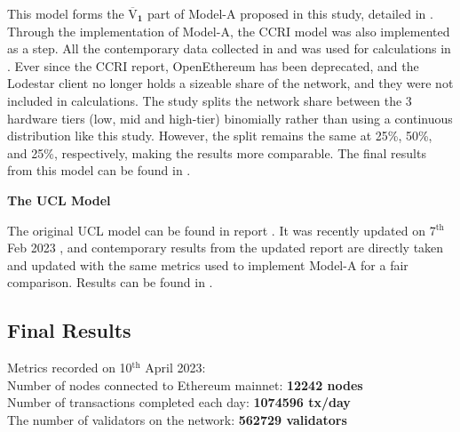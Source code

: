 This model \cite{CryptoCarbonRatingsInstitute2022TheNetwork} forms the $ \boldsymbol{\overline{\mathrm{V}}_{1}}$ part of Model-A proposed in this study, detailed in . Through the implementation of Model-A, the CCRI model was also implemented as a step. All the contemporary data collected in  and  was used for calculations in . Ever since the CCRI report, OpenEthereum has been deprecated, and the Lodestar client no longer holds a sizeable share of the network, and they were not included in calculations. The study splits the network share between the 3 hardware tiers (low, mid and high-tier) binomially rather than using a continuous distribution like this study. However, the split remains the same at 25\%, 50\%, and 25\%, respectively, making the results more comparable. The final results from this model can be found in .

\textbf{The UCL Model} 

The original UCL model can be found in report \cite{Platt2022TheProof-of-Work}. It was recently updated on 7$\mathrm{^{th}}$ Feb 2023 \cite{IbanezTheExpansion}, and contemporary results from the updated report are directly taken and updated with the same metrics used to implement Model-A for a fair comparison. Results can be found in . 


\subsection{Final Results}
\label{ResultsSection}
Metrics recorded on 10$\mathrm{^{th}}$ April 2023: \\
Number of nodes connected to Ethereum mainnet: \textbf{12242 nodes} \cite{NodewatchAnalytics} \\
Number of transactions completed each day: \textbf{1074596 tx/day}  \cite{EthereumBlockchair} \\
The number of validators on the network: \textbf{562729 validators} 
\cite{EthereumEthereum.orgc}

